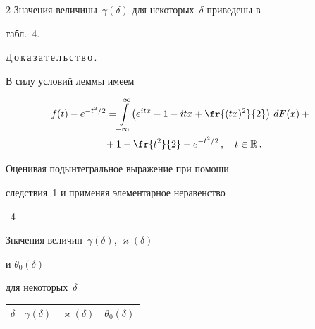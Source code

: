 \begin{multicols}{2}
Значения величины~$\gamma(\delta)$ для некоторых~$\delta$ приведены в


табл.~4.








\smallskip





\noindent


Д\,о\,к\,а\,з\,а\,т\,е\,л\,ь\,с\,т\,в\,о\,. \


В силу условий леммы имеем


\begin{multline*}


\!\!f(t)-e^{-t^2/2}= \!\int\limits_{-\infty}^\infty\!\left(e^{itx}-1-itx+


\fr{(tx)^2}{2}\right)\,dF(x)+{}\\


{}+1-\fr{t^2}{2}-e^{-t^2/2}\,,\quad


t\in\R\,.


\end{multline*}


Оценивая подынтегральное выражение при помощи


следствия~1 и применяя элементарное неравенство


\pagebreak





\noindent %


\begin{center}


\parbox{74mm}{{\tablename~4}\ \ \small{Значения величин~$\gamma(\delta)$, $\varkappa(\delta)$


и $\theta_0(\delta)$


для некоторых~$\delta$}}


\end{center}







{\small


\begin{center}


\tabcolsep=15pt


\begin{tabular}{|c|c|c|c|}


\hline


$\delta$ & $\gamma(\delta)$ & $\varkappa(\delta)$& $\theta_0(\delta)$  \\



\end{tabular}
\end{center}}
\end{multicols}
